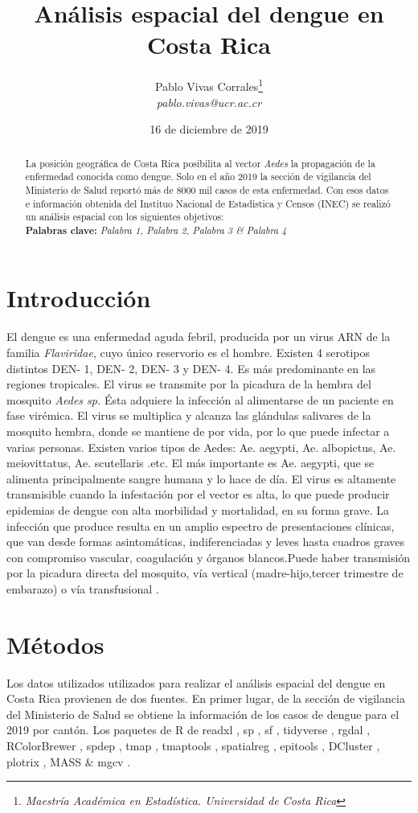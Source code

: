 \documentclass[12pt,a4paper]{article}
\author{Pablo Vivas Corrales\footnote{\textit{Maestría Académica en Estadística. Universidad de Costa Rica}}\\\textit{pablo.vivas@ucr.ac.cr}}
\title{Análisis espacial del dengue en Costa Rica}
\date{16 de diciembre de 2019}
\begin{document}
\maketitle
\begin{abstract}
\noindent
La posición geográfica de Costa Rica posibilita al vector \textit{Aedes} la propagación de la enfermedad conocida como dengue. Solo en el año 2019 la sección de vigilancia del Ministerio de Salud reportó más de 8000 mil casos de esta enfermedad. Con esos datos e información obtenida del Instituo Nacional de Estadistica y Censos (INEC) se realizó un análisis espacial con los siguientes objetivos: \\
\textbf{Palabras clave:} \textit{Palabra 1, Palabra 2, Palabra 3 \& Palabra 4} 
\end{abstract}
\section{Introducción}

El dengue es una enfermedad aguda febril, producida por un virus ARN de la familia \textit{Flaviridae}, cuyo único reservorio es el hombre. Existen 4 serotipos distintos DEN- 1, DEN- 2, DEN- 3 y DEN- 4. Es más predominante en las regiones tropicales. El virus se transmite por la picadura de la hembra del mosquito \textit{Aedes sp.} Ésta adquiere la infección al alimentarse de un paciente en fase virémica. El virus se multiplica y alcanza las glándulas salivares de la mosquito hembra, donde se mantiene de por vida, por lo que puede infectar a varias personas. Existen varios tipos de Aedes: Ae. aegypti, Ae. albopictus, Ae. meiovittatus, Ae. scutellaris .etc. El más importante es Ae. aegypti, que se alimenta principalmente sangre humana y lo hace de día. El virus es altamente transmisible cuando la infestación por el vector es alta, lo que puede producir epidemias de dengue con alta morbilidad y mortalidad, en su forma grave. La infección que produce resulta en un amplio espectro de presentaciones clínicas, que van desde formas asintomáticas, indiferenciadas y leves hasta cuadros graves con compromiso vascular, coagulación y órganos blancos.Puede haber transmisión por la picadura directa del mosquito, vía vertical (madre-hijo,tercer trimestre de embarazo) o vía transfusional \cite{CajaCostarricensedelSeguroSocial2013}.
\section{Métodos}

Los datos utilizados utilizados para realizar el análisis espacial del dengue en Costa Rica provienen de dos fuentes. En primer lugar, de la sección de vigilancia del Ministerio de Salud se obtiene la información de los casos de dengue para el 2019 por cantón. Los paquetes de R \cite{R} de readxl \cite{readxl}, sp \cite{sp}, sf \cite{sf}, tidyverse \cite{tidy}, rgdal \cite{rdal}, RColorBrewer \cite{Rcolor}, spdep \cite{sp}, tmap \cite{tmap}, tmaptools \cite{tmaptools}, spatialreg \cite{sp}, epitools \cite{epitools}, DCluster \cite{dcluster}, plotrix \cite{plotrix}, MASS \cite{MASS} \& mgcv \cite{mgcv}.
\end{document}
